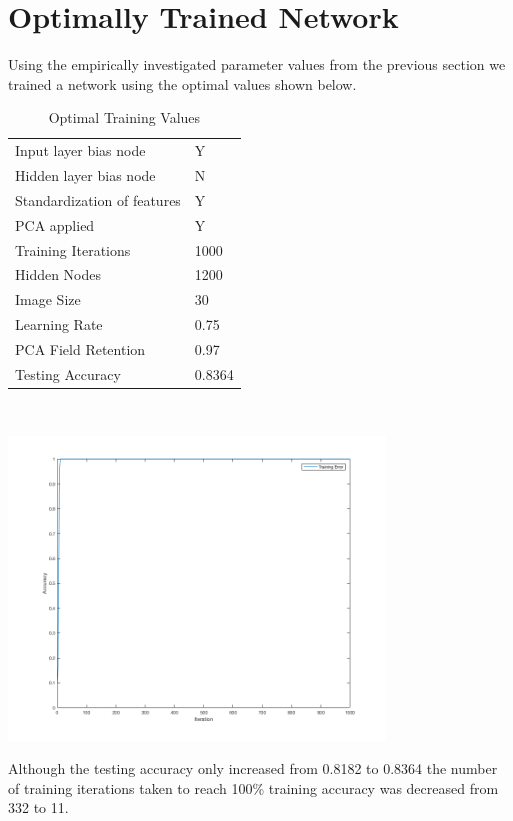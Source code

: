 \documentclass[12pt]{article}
\begin{document}
\section{Optimally Trained Network}
Using the empirically investigated parameter values from the previous section we trained a network using the optimal values shown below.
\begin{center}
  \begin{table}[H]
    \begin{varwidth}[b]{0.4\linewidth}
      \centering
      \begin{tabular}{l|l}
        \hline
        Input layer bias node & Y \\
        Hidden layer bias node & N \\
        Standardization of features & Y \\
        PCA applied & Y \\
        \hline
        Training Iterations & 1000 \\
        Hidden Nodes & 1200 \\
        Image Size & 30 \\
        Learning Rate & 0.75 \\
        PCA Field Retention & 0.97 \\
        \hline
        Testing Accuracy & 0.8364 \\
        \hline
      \end{tabular}
      ~\\[40pt]
      \caption{Optimal Training Values}
      \label{table:optimal_table}
    \end{varwidth}%
    \hfill
    \begin{minipage}[b]{0.6\linewidth}
      \centering
      \includegraphics[width=100mm]{./accuracy_imgs/optimal_network.png}
      \label{fig:optimal_plot}
    \end{minipage}
  \end{table}
\end{center}
Although the testing accuracy only increased from 0.8182 to 0.8364 the number of training iterations taken to reach 100\% training accuracy was decreased from 332 to 11.
\end{document}
